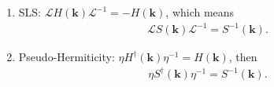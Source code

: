 \documentclass[aps,pra,reprint,superscriptaddress,showkeys,amsmath,amssymb,longbibliography]{revtex4-1}
\begin{document}
\begin{enumerate}
\item
  SLS: $\mathcal{L}H(\textbf{k})\mathcal{L}^{-1}=-H(\textbf{k})$, which means
  \begin{eqnarray}
    \mathcal{L}S(\textbf{k})\mathcal{L}^{-1}=S^{-1}(\textbf{k}).
  \end{eqnarray}

\item
  Pseudo-Hermiticity: $\eta H^{\dagger}(\textbf{k}) \eta^{-1} = H(\textbf{k})$, then
  \begin{eqnarray}
    \eta S^\dagger (\textbf{k}) \eta^{-1}=S^{-1}(\textbf{k}).
  \end{eqnarray}

\end{enumerate}
\end{document}
